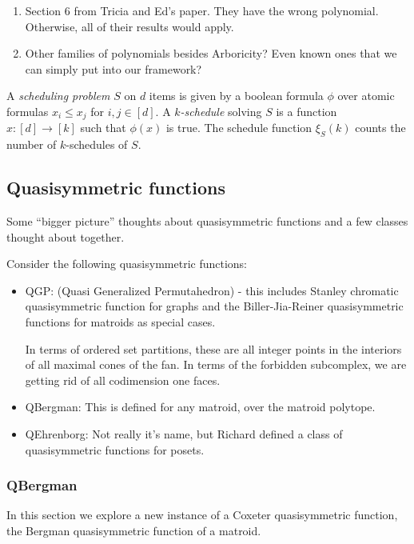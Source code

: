 \documentclass[12pt]{amsart}
\newcommand{\defn}[1]{\emph{#1}}
\begin{document}
\begin{enumerate}
\item Section 6 from Tricia and Ed's paper.  They have the wrong polynomial.  Otherwise, all of their results would apply.
\item Other families of polynomials besides Arboricity?  Even known ones that we can simply put into our framework?
\end{enumerate}


A \defn{scheduling problem} $S$ on $d$ items is given by a boolean
formula $\phi$ over atomic formulas $x_i\leq x_j$ for $i,j\in[d]$. A
\defn{$k$-schedule} solving $S$ is a function $x:[d]\rightarrow[k]$
such that $\phi(x)$ is true. The schedule function $\xi_S(k)$ counts
the number of $k$-schedules of $S$.



\subsection{Quasisymmetric functions}

Some ``bigger picture'' thoughts about quasisymmetric functions and a few classes thought about together. 

Consider the following quasisymmetric functions:

\begin{itemize}
\item QGP: (Quasi Generalized Permutahedron) - this includes Stanley chromatic quasisymmetric function for graphs and the Biller-Jia-Reiner quasisymmetric functions for matroids as special cases.

In terms of ordered set partitions, these are all integer points in the interiors of all maximal cones of the fan.  In terms of the forbidden subcomplex, we are getting rid of all codimension one faces.  

\item QBergman: This is defined for any matroid, over the matroid polytope.

\item QEhrenborg: Not really it's name, but Richard defined a class of quasisymmetric functions for posets.

\end{itemize}

\subsubsection{QBergman}

In this section we explore a new instance of a Coxeter quasisymmetric
function, the Bergman quasisymmetric function of a matroid.
\end{document}

